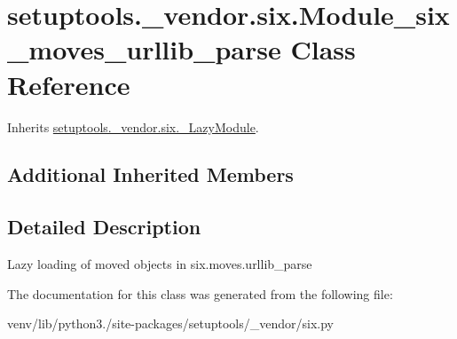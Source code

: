 \hypertarget{classsetuptools_1_1__vendor_1_1six_1_1_module__six__moves__urllib__parse}{}\section{setuptools.\+\_\+vendor.\+six.\+Module\+\_\+six\+\_\+moves\+\_\+urllib\+\_\+parse Class Reference}
\label{classsetuptools_1_1__vendor_1_1six_1_1_module__six__moves__urllib__parse}


Inherits \hyperlink{classsetuptools_1_1__vendor_1_1six_1_1___lazy_module}{setuptools.\+\_\+vendor.\+six.\+\_\+\+Lazy\+Module}.

\subsection*{Additional Inherited Members}


\subsection{Detailed Description}
\begin{DoxyVerb}Lazy loading of moved objects in six.moves.urllib_parse\end{DoxyVerb}
 

The documentation for this class was generated from the following file\+:\begin{DoxyCompactItemize}
\item 
venv/lib/python3./site-\/packages/setuptools/\+\_\+vendor/six.\+py\end{DoxyCompactItemize}
